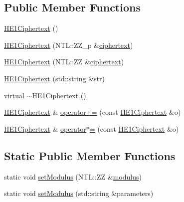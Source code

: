 \subsection*{Public Member Functions}
\begin{DoxyCompactItemize}
\item 
\hyperlink{classHE1Ciphertext_afd58548a4f93ef8576f35677fa42e35c}{H\+E1\+Ciphertext} ()
\item 
\hyperlink{classHE1Ciphertext_a4956d0c93fecd2db56a51e77f6f959ef}{H\+E1\+Ciphertext} (N\+T\+L\+::\+Z\+Z\+\_\+p \&\hyperlink{classCiphertext_adef9aae9d923eb100b4a1ad58ce495f1}{ciphertext})
\item 
\hyperlink{classHE1Ciphertext_a178b26d8b0a54d3e1e0e5bb04bb09bd6}{H\+E1\+Ciphertext} (N\+T\+L\+::\+ZZ \&\hyperlink{classCiphertext_adef9aae9d923eb100b4a1ad58ce495f1}{ciphertext})
\item 
\hyperlink{classHE1Ciphertext_a1f1b6b024af4615bc3a54025c42382dc}{H\+E1\+Ciphertext} (std\+::string \&str)
\item 
virtual \hyperlink{classHE1Ciphertext_ab5b083f4f4d980d127751df627b976e9}{$\sim$\+H\+E1\+Ciphertext} ()
\item 
\hyperlink{classHE1Ciphertext}{H\+E1\+Ciphertext} \& \hyperlink{classHE1Ciphertext_a3ce293f9fd8d25c2921c589bb8f8c171}{operator+=} (const \hyperlink{classHE1Ciphertext}{H\+E1\+Ciphertext} \&o)
\item 
\hyperlink{classHE1Ciphertext}{H\+E1\+Ciphertext} \& \hyperlink{classHE1Ciphertext_ab2eb089852b2d0155c4da6080886a75a}{operator$\ast$=} (const \hyperlink{classHE1Ciphertext}{H\+E1\+Ciphertext} \&o)
\end{DoxyCompactItemize}
\subsection*{Static Public Member Functions}
\begin{DoxyCompactItemize}
\item 
static void \hyperlink{classHE1Ciphertext_a3cf78bc8d18c72fbb8bd116447371bf2}{set\+Modulus} (N\+T\+L\+::\+ZZ \&\hyperlink{classHE1Ciphertext_a924bd87bcc91518945bc039f10a20a48}{modulus})
\item 
static void \hyperlink{classHE1Ciphertext_a7b9c00baa1bfa692cfa518f98a46da78}{set\+Modulus} (std\+::string \&parameters)
\end{DoxyCompactItemize}
